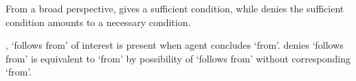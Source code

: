 




\begin{note}
  From a broad perspective, \supportI{} gives a sufficient condition, while \supportII{} denies the sufficient condition amounts to a necessary condition.

  \supportI{}, `follows from' of interest is present when agent concludes `from'.
  \supportII{} denies `follows from' is equivalent to `from' by possibility of `follows from' without corresponding `from'.
\end{note}



\section{\supportI{}}
\label{cha:ros:I}


